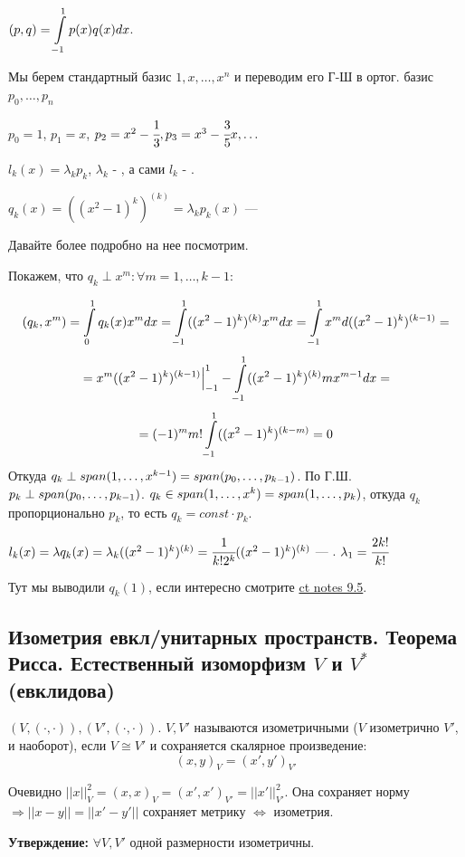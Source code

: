 $(p,q) = \displaystyle\int\limits_{-1}^{1}p(x)q(x)dx$.

Мы берем стандартный базис $1,x,\ldots,x^n$ и переводим его Г-Ш в ортог. базис $p_0,\ldots, p_n$

$p_0 = 1$, $p_1 = x$, $p_2 = x^2-\cfrac{1}{3}, p_3 = {x^3}-{\cfrac{3}{5}x}, \ldots$

$l_k(x) = \lambda_k p_k$, $\lambda_k$ - , а сами $l_k$ - .

$q_k(x) = ((x^2-1)^k)^{(k)} = \lambda_k p_k(x)$ --- 

Давайте более подробно на нее посмотрим. 

Покажем, что $q_k \perp x^m: \forall m = 1,\ldots, k-1$:

$$(q_k, x^m) = \displaystyle\int\limits_{0}^{1}q_k(x) x^m dx = \displaystyle\int\limits_{-1}^{1}((x^2-1)^k)^{(k)}x^m dx = \displaystyle\int\limits_{-1}^{1}x^m d ((x^2-1)^k)^{(k-1)} = $$
$$= x^m ((x^2-1)^k)^{(k-1)}\Big|_{-1}^1 - \displaystyle\int\limits_{-1}^{1}((x^2-1)^k)^{(k)}m x^{m-1}dx = $$
$$ = (-1)^m m! \displaystyle\int\limits_{-1}^{1}((x^2-1)^k)^{(k-m)} =0$$
Откуда $q_k \perp span(1,\ldots, x^{k-1}) = span(p_0,\ldots,p_{k-1})$. По Г.Ш. $p_k \perp span (p_0,\ldots, p_{k-1})$. $q_k\in span(1,\ldots, x^k) = span (1,\ldots, p_k)$, откуда $q_k$ пропорционально $p_k$, то есть $q_k = const \cdot p_k$.

$l_k(x) = \lambda q_k(x) = \lambda_k ((x^2-1)^k)^{(k)} = \cfrac{1}{k!2^k}((x^2-1)^k)^{(k)}$ --- .  $\lambda_1 = \cfrac{2k!}{k!}$

Тут мы выводили $q_k(1)$, если интересно смотрите \href{https://t.me/c/2402207436/2045/2131}{ct notes 9.5}.

\pagebreak
\subsection{Изометрия евкл/унитарных пространств. Теорема Рисса. Естественный изоморфизм $V$ и $V^*$ (евклидова)}

 $(V, (\cdot,\cdot)), (V', (\cdot,\cdot))$. $V, V'$ называются изометричными ($V$ изометрично $V'$, и наоборот), если $V \cong V'$ и сохраняется скалярное произведение:
$$(x,y)_V = (x',y')_{V'}$$

Очевидно $||x||^2_V = (x,x)_V =(x',x')_{V'} = ||x'||^2_{V'}$. Она сохраняет норму $\Rightarrow||x-y|| = ||x'-y'||$ сохраняет метрику $\Leftrightarrow$ изометрия.

\textbf{Утверждение:} $\forall V, V'$ одной размерности изометричны.

